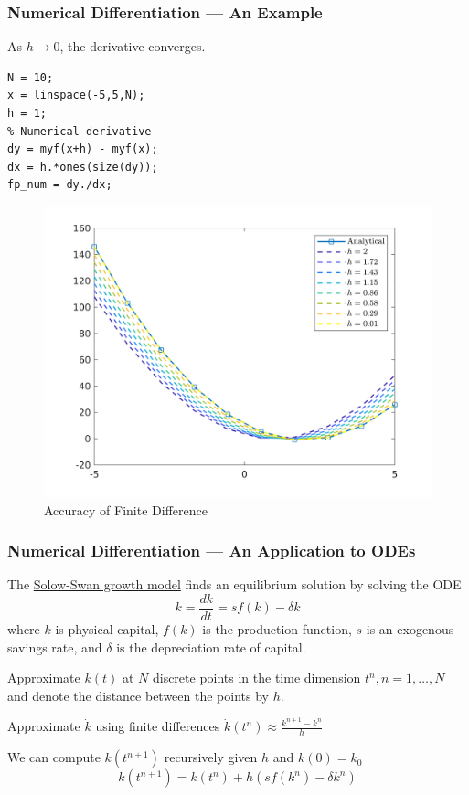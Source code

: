 \documentclass[11pt,xcolor={svgnames},aspectratio=169,usepdftitle=false]{beamer}
\let\toneitemize\itemize
\let\ttwoitemize\enditemize
\renewenvironment{itemize}{\toneitemize\addtolength{\itemsep}{0.7\baselineskip}}{\ttwoitemize}
\begin{document}
\begin{frame}[fragile]
  \frametitle{Numerical Differentiation --- An Example}
\begin{minipage}[r]{0.38\textwidth}
{\footnotesize As $h\rightarrow 0$, the derivative converges.}
\begin{lstlisting}
N = 10;
x = linspace(-5,5,N);
h = 1;
% Numerical derivative
dy = myf(x+h) - myf(x);
dx = h.*ones(size(dy));
fp_num = dy./dx;
\end{lstlisting}
\end{minipage}
\begin{minipage}[r]{0.61\textwidth}
  \begin{figure}
    \centering
    \includegraphics[width = \textwidth]{../figures/finite_differences.png}
    \caption{Accuracy of Finite Difference}
    \label{fig:finite_differences}
  \end{figure}
\end{minipage}
\end{frame}

\begin{frame}
  \frametitle{Numerical Differentiation --- An Application to ODEs}
\begin{itemize}
  \item The \href{https://en.wikipedia.org/wiki/Solow–Swan_model}{Solow-Swan growth model} finds an equilibrium solution by solving the ODE
  \begin{equation}
    \dot{k} = \frac{dk}{dt} = s f(k) - \delta k
    \label{eqn:solow_capital}
  \end{equation}
  where $k$ is physical capital, $f(k)$ is the production function, $s$ is an exogenous savings rate, and $\delta$ is the depreciation rate of capital.
  \item Approximate $k(t)$ at $N$ discrete points in the time dimension $t^n, n = 1,\ldots, N$ and denote the distance between the points by $h$.
  \item Approximate $\dot{k}$ using finite differences $\dot{k}(t^n) \approx \frac{k^{n+1} - k^n}{h}$
  \item We can compute $k(t^{n+1})$ recursively given $h$ and $k(0) = k_0$ 
  \[
  k(t^{n+1}) = k(t^{n}) + h \left(s f(k^n) - \delta k^n\right)
  \]
\end{itemize}
\end{frame}
\end{document}
